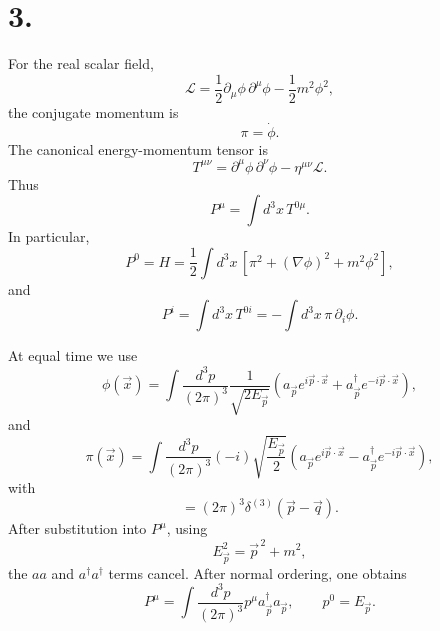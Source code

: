 \documentclass{article}
\begin{document}
\section*{3.}

For the real scalar field,
\begin{equation}
    \mathcal L
    =
    \frac12 \partial_\mu\phi\,\partial^\mu\phi
    -
    \frac12 m^2\phi^2,
\end{equation}
the conjugate momentum is
\begin{equation}
    \pi=\dot\phi .
\end{equation}
The canonical energy-momentum tensor is
\begin{equation}
    T^{\mu\nu}
    =
    \partial^\mu\phi\,\partial^\nu\phi
    -
    \eta^{\mu\nu}\mathcal L .
\end{equation}
Thus
\begin{equation}
    P^\mu
    =
    \int d^3x\,T^{0\mu}.
\end{equation}
In particular,
\begin{equation}
    P^0=H
    =
    \frac12\int d^3x\,
    \left[
        \pi^2+(\nabla\phi)^2+m^2\phi^2
    \right],
\end{equation}
and
\begin{equation}
    P^i
    =
    \int d^3x\,T^{0i}
    =
    -\int d^3x\,\pi\,\partial_i\phi .
\end{equation}

At equal time we use
\begin{equation}
    \phi(\vec x)
    =
    \int\frac{d^3p}{(2\pi)^3}
    \frac{1}{\sqrt{2E_{\vec p}}}
    \left(
        a_{\vec p}e^{i\vec p\cdot\vec x}
        +
        a_{\vec p}^{\dagger}e^{-i\vec p\cdot\vec x}
    \right),
\end{equation}
and
\begin{equation}
    \pi(\vec x)
    =
    \int\frac{d^3p}{(2\pi)^3}
    (-i)\sqrt{\frac{E_{\vec p}}{2}}
    \left(
        a_{\vec p}e^{i\vec p\cdot\vec x}
        -
        a_{\vec p}^{\dagger}e^{-i\vec p\cdot\vec x}
    \right),
\end{equation}
with
\begin{equation}
    [a_{\vec p},a_{\vec q}^{\dagger}]
    =
    (2\pi)^3\delta^{(3)}(\vec p-\vec q).
\end{equation}
After substitution into \(P^\mu\), using
\begin{equation}
    E_{\vec p}^2=\vec p^{\,2}+m^2,
\end{equation}
the \(aa\) and \(a^\dagger a^\dagger\) terms cancel. After normal ordering, one obtains
\begin{equation}
    \boxed{
    P^\mu
    =
    \int\frac{d^3p}{(2\pi)^3}
    p^\mu
    a_{\vec p}^{\dagger}a_{\vec p}
    },
    \qquad
    p^0=E_{\vec p}.
\end{equation}
\end{document}
